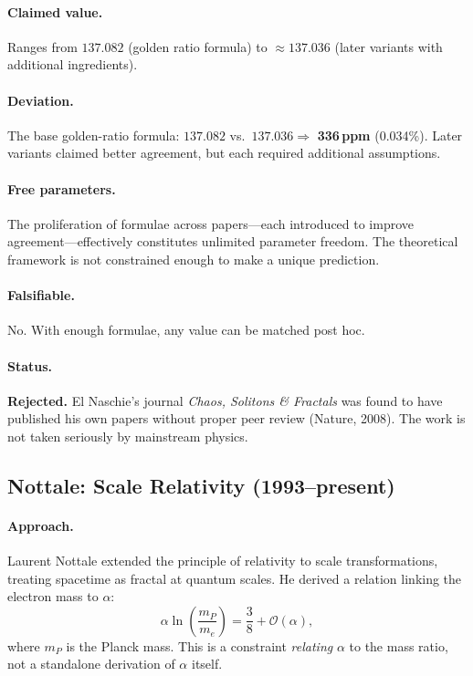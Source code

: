 \documentclass[11pt,a4paper]{article}
\begin{document}
\paragraph{Claimed value.}
Ranges from $137.082$ (golden ratio formula) to $\approx 137.036$ (later variants with additional ingredients).

\paragraph{Deviation.}
The base golden-ratio formula: $137.082$ vs.\ $137.036 \Rightarrow$ \textbf{336\,ppm} (0.034\%).
Later variants claimed better agreement, but each required additional assumptions.

\paragraph{Free parameters.}
The proliferation of formulae across papers---each introduced to improve agreement---effectively constitutes unlimited parameter freedom.  The theoretical framework is not constrained enough to make a unique prediction.

\paragraph{Falsifiable.}
No.  With enough formulae, any value can be matched post hoc.

\paragraph{Status.}
\textbf{Rejected.}  El Naschie's journal \textit{Chaos, Solitons \& Fractals} was found to have published his own papers without proper peer review (Nature, 2008).  The work is not taken seriously by mainstream physics.

\subsection{Nottale: Scale Relativity (1993--present)}\label{sec:nottale}

\paragraph{Approach.}
Laurent Nottale extended the principle of relativity to scale transformations, treating spacetime as fractal at quantum scales.  He derived a relation linking the electron mass to $\alpha$:
\begin{equation}
\alpha \ln\!\left(\frac{m_P}{m_e}\right) = \frac{3}{8} + \mathcal{O}(\alpha),
\end{equation}
where $m_P$ is the Planck mass.  This is a constraint \emph{relating} $\alpha$ to the mass ratio, not a standalone derivation of $\alpha$ itself.
\end{document}
